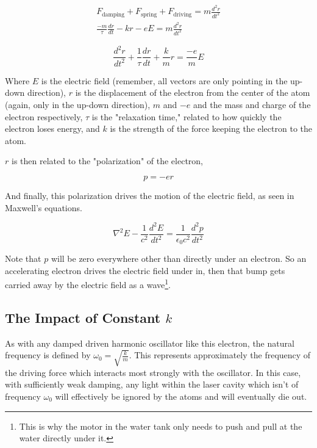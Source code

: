 \documentclass[12pt]{article}
\begin{document}
\begin{eqnarray}
    F_{\text{damping}} + F_{\text{spring}} + F_{\text{driving}} = m \frac{d^2 r}{dt^2}
    \\
    \frac{-m}{\tau}\frac{dr}{dt} - kr - e E = m \frac{d^2 r}{dt^2}
\end{eqnarray}

\begin{equation}\label{eqn:r-motion}
    \frac{d^2 r}{dt^2} + \frac{1}{\tau} \frac{dr}{dt} + \frac{k}{m} r = \frac{-e}{m}E
\end{equation}

Where $E$ is the electric field (remember, all vectors are only pointing in the up-down direction), $r$ is the displacement of the electron from the center of the atom (again, only in the up-down direction), $m$ and $-e$ and the mass and charge of the electron respectively, $\tau$ is the "relaxation time," related to how quickly the electron loses energy, and $k$ is the strength of the force keeping the electron to the atom.

$r$ is then related to the "polarization" of the electron,

\begin{equation}\label{eqn:polarization}
    p = -e r
\end{equation}

And finally, this polarization drives the motion of the electric field, as seen in Maxwell's equations.

\begin{equation}\label{eqn:maxwells}
    \nabla^2 E - \frac{1}{c^2} \frac{d^2 E}{d t^2} = \frac{1}{\epsilon_0 c^2} \frac{d^2 p}{dt^2}
\end{equation}

Note that $p$ will be zero everywhere other than directly under an electron. So an accelerating electron drives the electric field under in, then that bump gets carried away by the electric field as a wave\footnote{This is why the motor in the water tank only needs to push and pull at the water directly under it.}.

\subsection{The Impact of Constant $k$}

As with any damped driven harmonic oscillator like this electron, the natural frequency is defined by $\omega_0 = \sqrt{\frac{k}{m}}$. This represents approximately the frequency of the driving force which interacts most strongly with the oscillator. In this case, with sufficiently weak damping, any light within the laser cavity which isn't of frequency $\omega_0$ will effectively be ignored by the atoms and will eventually die out.
\end{document}
